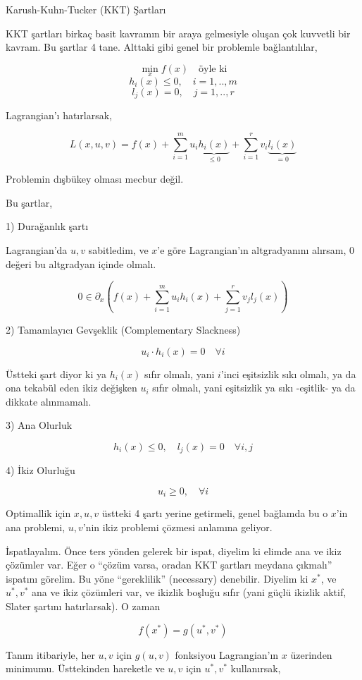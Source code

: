\documentclass[12pt,fleqn]{article}\usepackage{../../common}
\begin{document}
Karush-Kuhn-Tucker (KKT) Şartları

KKT şartları birkaç basit kavramın bir araya gelmesiyle oluşan çok kuvvetli
bir kavram. Bu şartlar 4 tane. Alttaki gibi genel bir problemle bağlantılılar,

$$
\min_x f(x) \quad \textrm{öyle ki}
$$
$$
h_i(x) \le 0, \quad i=1,..,m
$$
$$
l_j(x) = 0, \quad j=1,..,r
$$

Lagrangian'ı hatırlarsak, 

$$
L(x,u,v) =  f(x) + 
\sum_{i=1}^{m} u_i \underbrace{h_i(x)}_{\le 0} + 
\sum_{i=1}^{r} v_i \underbrace{l_i(x)}_{=0}
$$

Problemin dışbükey olması mecbur değil. 

Bu şartlar,

1) Durağanlık şartı

Lagrangian'da $u,v$ sabitledim, ve $x$'e göre Lagrangian'ın altgradyanını
alırsam, 0 değeri bu altgradyan içinde olmalı. 

$$
0 \in \partial_x \left(
f(x) + \sum_{i=1}^{m} u_i h_i(x) + \sum_{j=1}^{r} v_j l_j(x) 
\right)
$$

2) Tamamlayıcı Gevşeklik (Complementary Slackness)

$$
u_i \cdot h_i(x) = 0 \quad \forall i
$$

Üstteki şart diyor ki ya $h_i(x)$ sıfır olmalı, yani $i$'inci eşitsizlik
sıkı olmalı, ya da ona tekabül eden ikiz değişken $u_i$ sıfır olmalı, yani
eşitsizlik ya sıkı -eşitlik- ya da dikkate alınmamalı.

3) Ana Olurluk

$$
h_i(x) \le 0, \quad l_j(x) = 0 \quad \forall i,j
$$

4) İkiz Olurluğu

$$
u_i \ge 0, \quad \forall i
$$

Optimallik için $x,u,v$ üstteki 4 şartı yerine getirmeli, genel bağlamda bu
o $x$'in ana problemi, $u,v$'nin ikiz problemi çözmesi anlamına geliyor. 

İspatlayalım. Önce ters yönden gelerek bir ispat, diyelim ki elimde ana ve
ikiz çözümler var. Eğer o ``çözüm varsa, oradan KKT şartları meydana
çıkmalı'' ispatını görelim. Bu yöne ``gereklilik'' (necessary)
denebilir. Diyelim ki $x^\ast$, ve $u^\ast,v^\ast$ ana ve ikiz çözümleri var, ve
ikizlik boşluğu sıfır (yani güçlü ikizlik aktif, Slater şartını
hatırlarsak). O zaman

$$
f(x^\ast) = g(u^\ast,v^\ast)
$$

Tanım itibariyle, her $u,v$ için $g(u,v)$ fonksiyou Lagrangian'ın $x$
üzerinden minimumu. Üsttekinden hareketle ve $u,v$ için $u^\ast,v^\ast$
kullanırsak,
\end{document}
